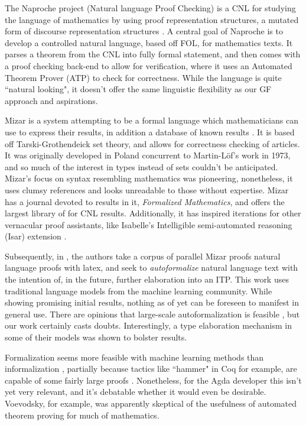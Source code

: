 The Naproche project (Natural language Proof Checking) is a CNL for studying the
language of mathematics by using proof representation structures, a mutated form
of discourse representation structures \cite{cramer2009naproche}. A central
goal of Naproche is to develop a controlled natural language, based off FOL, for
mathematics texts. It parses a theorem from the CNL into fully formal
statement, and then comes with a proof checking back-end to allow for verification,
where it uses an Automated Theorem Prover (ATP) to check for correctness.
While the language is quite ``natural looking", it doesn't offer the same
linguistic flexibility as our GF approach and aspirations.

Mizar is a system attempting to be a formal language which mathematicians can
use to express their results, in addition a database of known results
\cite{rudnicki1992overview}. It is based off Tarski-Grothendeick set theory, and
allows for correctness checking of articles. It was originally developed in
Poland concurrent to Martin-Löf's work in 1973, and so much of the interest in
types instead of sets couldn't be anticipated. Mizar's focus on syntax
resembling mathematics was pioneering, nonetheless, it uses clumsy references
and looks unreadable to those without expertise. Mizar has a journal devoted to
results in it, \emph{Formalized Mathematics}, and offers the largest library of
for CNL results. Additionally, it has inspired iterations for other vernacular
proof assistants, like Isabelle's Intelligible semi-automated reasoning (Isar)
extension \cite{wenzel2004isabelle}.

Subsequently, in \cite{mlTrans}, the authors take a corpus of parallel Mizar
proofs natural language proofs with latex, and seek to \emph{autoformalize}
natural language text with the intention of, in the future, further elaboration
into an ITP. This work uses traditional language models from the machine
learning community. While showing promising initial results, nothing as of yet
can be foreseen to manifest in general use. There are opinions that large-scale
autoformalization is feasible \cite{49351}, but our work certainly casts doubts.
Interestingly, a type elaboration mechanism in some of their models was shown to
bolster results.

Formalization seems more feasible with machine learning methods than
informalization , partially because tactics like ``hammer" in Coq for example,
are capable of some fairly large proofs \cite{czajka2018hammer} . Nonetheless,
for the Agda developer this isn't yet very relevant, and it's debatable whether
it would even be desirable. Voevodsky, for example, was apparently skeptical of
the usefulness of automated theorem proving for much of mathematics.

